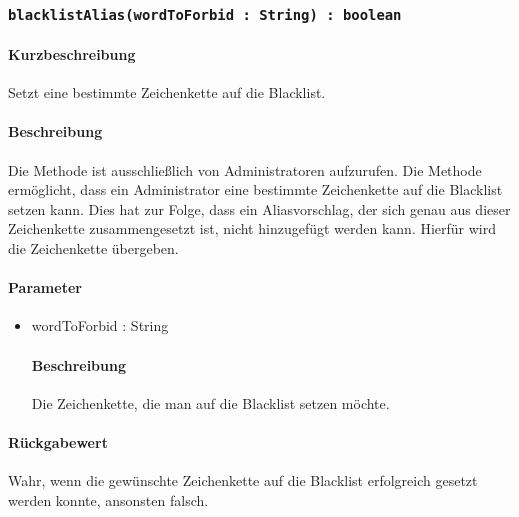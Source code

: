 \subsubsection{\texttt{blacklistAlias(wordToForbid : String) : boolean}}%
\paragraph*{Kurzbeschreibung}
Setzt eine bestimmte Zeichenkette auf die Blacklist.
\paragraph*{Beschreibung}
Die Methode ist ausschließlich von Administratoren aufzurufen.
Die Methode ermöglicht, dass ein Administrator eine bestimmte Zeichenkette auf die Blacklist setzen kann.
Dies hat zur Folge, dass ein Aliasvorschlag, der sich genau aus dieser Zeichenkette zusammengesetzt ist, nicht hinzugefügt werden kann.
Hierfür wird die Zeichenkette übergeben.
\paragraph*{Parameter}
\begin{itemize}
    \item wordToForbid : String
    		\paragraph*{Beschreibung}
    		Die Zeichenkette, die man auf die Blacklist setzen möchte.
\end{itemize}
\paragraph*{Rückgabewert}
Wahr, wenn die gewünschte Zeichenkette auf die Blacklist erfolgreich gesetzt werden konnte, ansonsten falsch.
